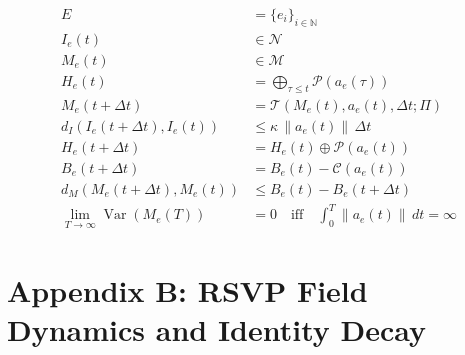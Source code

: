 \documentclass[11pt,oneside]{article}
\begin{document}
\begin{align}
E &= \{e_i\}_{i \in \mathbb{N}} \\[6pt]
I_e(t) &\in \mathcal{N} \\[6pt]
M_e(t) &\in \mathcal{M} \\[6pt]
H_e(t) &= \bigoplus_{\tau \le t} \mathcal{P}(a_e(\tau)) \\[10pt]

M_e(t+\Delta t) &= \mathcal{T}\!\left(M_e(t), a_e(t), \Delta t ; \Pi \right) \\[10pt]

d_I\!\left(I_e(t+\Delta t), I_e(t)\right)
&\le \kappa \, \|a_e(t)\| \, \Delta t \\[10pt]

H_e(t+\Delta t) &= H_e(t) \oplus \mathcal{P}(a_e(t)) \\[10pt]

B_e(t+\Delta t) &= B_e(t) - \mathcal{C}\!\left(a_e(t)\right) \\[6pt]

d_M\!\left(M_e(t+\Delta t), M_e(t)\right)
&\le B_e(t) - B_e(t+\Delta t) \\[10pt]

\lim_{T \to \infty}
\operatorname{Var}\!\left(M_e(T)\right)
&= 0 \quad \text{iff} \quad
\int_0^T \|a_e(t)\| \, dt = \infty
\end{align}

\section{Appendix B: RSVP Field Dynamics and Identity Decay}
\end{document}
